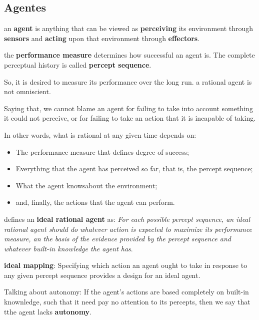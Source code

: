         \subsection{Agentes}
        
        
        an \textbf{agent} is anything that can be viewed as \textbf{perceiving} its environment through \textbf{sensors} and \textbf{acting} upon that environment through \textbf{effectors}.
        
        
        the \textbf{performance measure} determines how successful an agent is. The complete perceptual history is called \textbf{percept sequence}.
        
        So, it is desired to measure its performance over the long run.
        a rational agent is not omniscient. 
        
        Saying that, we cannot blame an agent for failing to take into account something it could not perceive, or for failing to take an action that it is incapable of taking.
        
        In other words, what is rational at any given time depends on:
        \begin{itemize}
            \item The performance measure that defines degree of success;
            \item Everything that the agent has perceived so far, that is, the percept sequence;
            \item What the agent knowsabout the environment;
            \item and, finally, the actions that the agent can perform.
        \end{itemize}
        
        \cite{ref:russell1995aima} defines an \textbf{ideal rational agent} as: \textit{For each possible percept sequence, an ideal rational agent should do whatever action is expected to maximize its performance measure, an the basis of the evidence provided by the percept sequence and whatever built-in knowledge the agent has}.
        
        \textbf{ideal mapping}: Specifying which action an agent ought to take in response to any given percept sequence provides a design for an ideal agent.
        
        Talking about autonomy: If the agent's actions are based completely on built-in knownledge, such that it need pay no attention to its percepts, then we say that tthe agent lacks \textbf{autonomy}.
        
